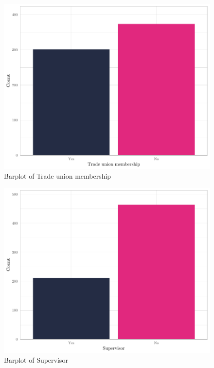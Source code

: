 \documentclass[
]{article}
\begin{document}
\begin{figure}[H]

{\centering \includegraphics[width=0.8\linewidth]{paper_files/figure-latex/unnamed-chunk-9-1} 

}

\caption{Barplot of Trade union membership}\label{fig:unnamed-chunk-9}
\end{figure}

\begin{figure}[H]

{\centering \includegraphics[width=0.8\linewidth]{paper_files/figure-latex/unnamed-chunk-10-1} 

}

\caption{Barplot of Supervisor}\label{fig:unnamed-chunk-10}
\end{figure}
\end{document}

